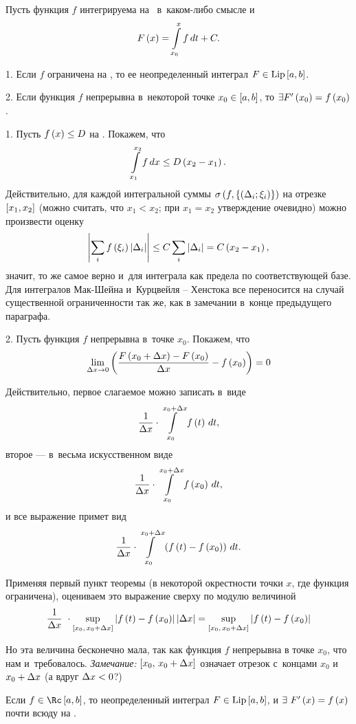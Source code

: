 \documentclass[draft]{article}
\begin{document}
\bigskip


Пусть функция $f$ интегрируема на \ab\ в~каком-либо смысле и
$$F\atx=\intd[x_0,x]f,t+C.$$

1. Если $f$ ограничена на \ab, то ее неопределенный интеграл
$F\islip \segab$.

2. Если функция $f$ непрерывна в~некоторой точке $x_0\in\segab$, то
$\exists F'\at(x_0)=f\at(x_0)$.

\pr

\medskip

1. Пусть $f\atx\le D$ на \ab. Покажем, что $$\intd[x_1,x_2]f,x\le
D\at(x_2-x_1).$$ Действительно, для каждой интегральной суммы
$\isum(f,\dixif)$ на отрезке $\seg[x_1,x_2]$ (можно считать, что
$x_1<x_2$; при $x_1=x_2$ утверждение очевидно) можно произвести
оценку $$\abs{\sumi\fxildi}\le C\sumi\ldei=C\at(x_2-x_1),$$ значит,
то же самое верно и~для интеграла как предела по соответствующей
базе. Для интегралов Мак-Шейна и~Курцвейля -- Хенстока все
переносится на случай существенной ограниченности так же, как в
замечании в~конце предыдущего параграфа.

\medskip

2. Пусть функция $f$ непрерывна в~точке $x_0$. Покажем, что
$$\lim\limits_{\dx\rightarrow0}
\at({{F\at(x_0+\dx)-F\at(x_0)\over\dx}-f\at(x_0)})=0$$

Действительно, первое слагаемое можно записать в~виде
$${1\over\dx}\cdot    \intd[x_0,x_0+\dx]    f\at(t),t,$$
второе --- в~весьма искусственном виде
$${1\over\dx}\cdot    \intd[x_0,x_0+\dx]    f\at(x_0),t,$$
и все выражение примет вид
$${1\over\dx}\cdot    \intd[x_0,x_0+\dx]    \at({f\at(t)-f\at(x_0)}),t.$$

Применяя первый пункт теоремы (в некоторой окрестности точки $x$,
где функция ограничена), оцениваем это выражение сверху по модулю
величиной
$${1\over\dx}\ \cdot    \sup\limits_{\seg[x_0,\,x_0+\dx]}
        \abs{f\at(t)-f\at(x_0)}\abs{\dx
}=        \sup\limits_{\seg[x_0,\,x_0+\dx]}
        \abs{f\at(t)-f\at(x_0)}$$

Но эта величина бесконечно мала, так как функция $f$ непрерывна в
точке $x_0$, что нам и~требовалось. {\sl Замечание:}
$\seg[x_0,\,x_0+\dx]$ означает отрезок с~концами $x_0$ и~$x_0+\Delta x$
(а вдруг $\Delta x < 0$?)

\prtm

\bigskip

\imp

Если $f\isriman[a,b]$, то неопределенный интеграл $F\islip \segab$,
и $\exists\ F'\atx=f\atx$ почти всюду на \ab.
\end{document}
